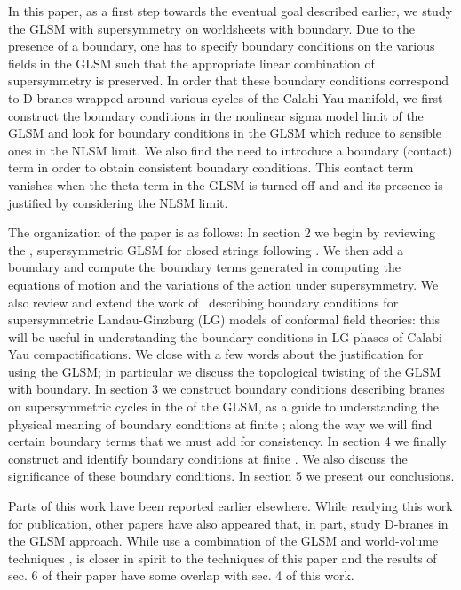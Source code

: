\documentclass[a4paper,12pt]{article}
\begin{document}
In this paper, as a first step towards the eventual goal described
earlier, we study the GLSM with \coordHE{} supersymmetry on worldsheets with
boundary. Due to the presence of a boundary, one has to specify boundary
conditions on the various fields in the GLSM such that the appropriate
linear combination of supersymmetry is preserved. In order that these
boundary conditions correspond to D-branes wrapped around various cycles of
the Calabi-Yau manifold, we first construct the boundary conditions in the
nonlinear sigma model limit of the GLSM and look for boundary conditions
in the GLSM which reduce to sensible ones in the NLSM limit. We also find
the need to introduce a boundary (contact) term in order to obtain
consistent boundary conditions. This contact term vanishes when the
theta-term in the GLSM is turned off and and its presence is justified by
considering the NLSM limit. 

The organization of the paper is as follows: In section 2 we begin by
reviewing the \coordHE{}, \coordHE{} supersymmetric GLSM for closed strings
following \cite{wittenphases}. We then add a boundary and compute the
boundary terms generated in computing the equations of motion and the
variations of the action under supersymmetry.  We also review and extend
the work of \cite{stt,boundarylg}\ describing boundary conditions for
\coordHE{} supersymmetric Landau-Ginzburg (LG) models of conformal field
theories: this will be useful in understanding the boundary conditions in
LG phases of Calabi-Yau compactifications. We close with a few words about
the justification for using the GLSM; in particular we discuss the
topological twisting of the GLSM with boundary. In section 3 we construct
boundary conditions describing branes on supersymmetric cycles in the \coordHE{} of the GLSM, as a guide to understanding the physical
meaning of boundary conditions at finite \coordHE{}; along the way we will find
certain boundary terms that we must add for consistency.  In section 4 we
finally construct and identify boundary conditions at finite \coordHE{}. We
also discuss the significance of these boundary conditions. In section 5
we present our conclusions. 

Parts of this work have been reported earlier
elsewhere\cite{thesis,talks}.  While readying this work for publication,
other papers \cite{HV,HIV,doug-diac} have also appeared that, in part,
study D-branes in the GLSM approach. While \cite{doug-diac} use a
combination of the GLSM and world-volume techniques , \cite{HIV} is closer
in spirit to the techniques of this paper and the results of sec. 6 of
their paper have some overlap with sec. 4 of this work. 
\end{document}
